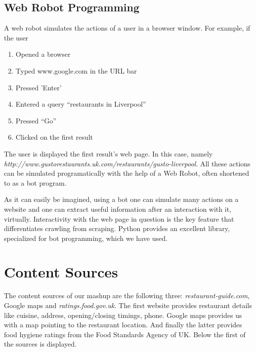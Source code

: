 \subsection{Web Robot Programming}
A web robot simulates the actions of a user in a browser window. For example, if the user
\begin{enumerate}
\item Opened a browser
\item Typed www.google.com in the URL bar
\item Pressed 'Enter'
\item Entered a query “restaurants in Liverpool”
\item Pressed “Go”
\item Clicked on the first result
\end{enumerate}

The user is displayed the first result's web page. In this case, namely \\
\emph{http://www.gustorestaurants.uk.com/restaurants/gusto-liverpool}. All these actions can be simulated programatically with the help of a Web Robot, often shortened to as a bot program.

As it can easily be imagined, using a bot one can simulate many actions on a website and one can extract useful information after an interaction with it, virtually. Interactivity with the web page in question is the key feature that differentiates crawling from scraping. Python provides an excellent library, specialized for bot programming, which we have used.

\section{Content Sources}
The content sources of our mashup are the following three: \emph{restaurant-guide.com}, Google maps and \emph{ratings.food.gov.uk}. The first website provides restaurant details like cuisine, address, opening/closing timings, phone. Google maps provides us with a map pointing to the restaurant location. And finally the latter provides food hygiene ratings from the Food Standards Agency of UK.
Below the first of the sources is displayed.

